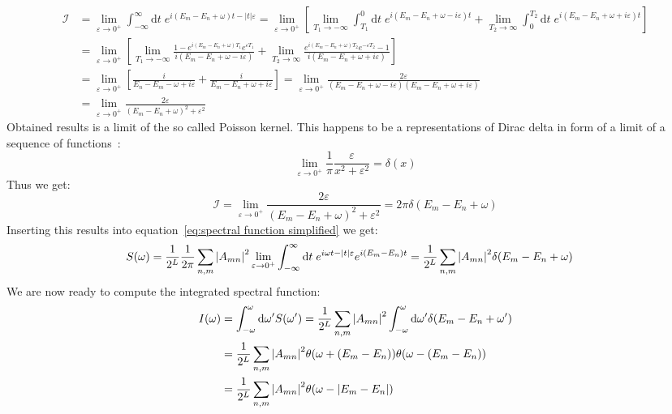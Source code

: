 \begin{align}
    \mathcal{I} &= \lim _{\varepsilon \to 0^+} \int_{-\infty}^{\infty} \mathrm{d} t \; 
    e^{ i (E_m-E_n+\omega)t -|t| \varepsilon} = \lim _{\varepsilon \to 0^+} 
    \left[\lim_{T_1\to -\infty}\int_{T_1}^{0} \mathrm{d} t \; e^{ i (E_m-E_n+\omega -i \varepsilon)t}+
    \lim_{T_2\to \infty}\int_{0}^{T_2} \mathrm{d} t \;  e^{ i (E_m-E_n+\omega + i\varepsilon)t}\right] \nonumber\\
    &= \lim _{\varepsilon \to 0^+} \left[\lim_{T_1\to -\infty} 
    \frac{1-e^{ i (E_m-E_n+\omega )T_1} e^{\varepsilon T_1}}{i (E_m-E_n+\omega -i \varepsilon)} + 
    \lim_{T_2\to \infty} \frac{e^{ i (E_m-E_n+\omega )T_2} e^{-\varepsilon T_2}-1}
    {i (E_m-E_n+\omega +i \varepsilon)}\right] \nonumber \\
    &= \lim _{\varepsilon \to 0^+} \left[\frac{i}{E_n-E_m-\omega +i \varepsilon} + 
    \frac{i}{E_m-E_n+\omega +i \varepsilon} \right] = \lim _{\varepsilon \to 0^+}
    \frac{2\varepsilon}{(E_m-E_n+\omega -i \varepsilon)(E_m-E_n+\omega +i \varepsilon)}\nonumber\\
    &=\lim _{\varepsilon \to 0^+}
    \frac{2\varepsilon}{(E_m-E_n+\omega)^2 +\varepsilon^2}
\end{align}
Obtained results is a limit of the so called Poisson kernel. This happens to be
a representations of Dirac delta in form of a limit of a sequence of functions~\autocite{byron1992mathematics}:
\begin{equation}
    \lim _{\varepsilon \to 0^+} \frac{1}{\pi} \frac{\varepsilon}{x^2 +\varepsilon^2} = \delta(x) 
\end{equation}
Thus we get:
\begin{equation}
    \mathcal{I} = \lim _{\varepsilon \to 0^+} \frac{2\varepsilon}{(E_m-E_n+\omega)^2 +\varepsilon^2}
    = 2\pi \delta(E_m-E_n+\omega)
\end{equation}
Inserting this results into equation~\eqref{eq:spectral function simplified} we get:
\begin{align}
    S(\omega) &= \frac{1}{2^L} \frac{1}{2 \pi}\sum_{n,m} \abs{A_{mn}}^2  
    \lim _{\varepsilon \to 0^+} \int_{-\infty}^{\infty} \mathrm{d} t \; e^{i \omega t-|t| 
    \varepsilon}e^{i (E_m-E_n) t} = \frac{1}{2^L}\sum_{n,m} \abs{A_{mn}}^2 \delta(E_m-E_n+\omega)
\end{align}
We are now ready to compute the integrated spectral function:
\begin{align}
    I(\omega) &= \int_{-\omega}^{\omega} \mathrm{d}\omega^{\prime} S(\omega^{\prime}) =
    \frac{1}{2^L}\sum_{n,m} \abs{A_{mn}}^2 \int_{-\omega}^{\omega} \mathrm{d}\omega^{\prime} 
    \delta(E_m-E_n+\omega^{\prime}) \nonumber \\ &= \frac{1}{2^L}\sum_{n,m} \abs{A_{mn}}^2
    \theta(\omega + (E_m-E_n))\theta(\omega - (E_m-E_n)) \nonumber\\
    &= \frac{1}{2^L}\sum_{n,m} \abs{A_{mn}}^2\theta(\omega - \abs{E_m-E_n})
\end{align}


